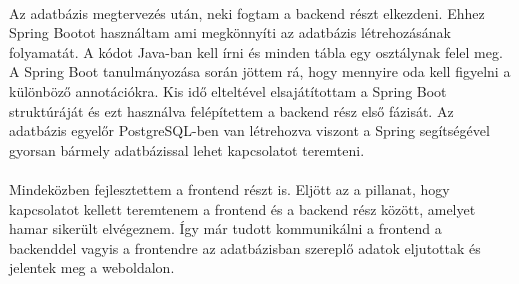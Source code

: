 	\paragraph{}
	Az adatbázis megtervezés után, neki fogtam a backend részt elkezdeni. Ehhez Spring Bootot használtam ami megkönnyíti az adatbázis létrehozásának folyamatát. A kódot Java-ban kell írni és minden tábla egy osztálynak felel meg. A Spring Boot tanulmányozása során jöttem rá, hogy mennyire oda kell figyelni a különböző annotációkra. Kis idő elteltével elsajátítottam a Spring Boot struktúráját és ezt használva felépítettem a backend rész első fázisát. Az adatbázis egyelőr PostgreSQL-ben van létrehozva viszont a Spring segítségével gyorsan bármely adatbázissal lehet kapcsolatot teremteni.
	\paragraph{}
	Mindeközben fejlesztettem a frontend részt is. Eljött az a pillanat, hogy kapcsolatot kellett teremtenem a frontend és a backend rész között, amelyet hamar sikerült elvégeznem. Így már tudott kommunikálni a frontend a backenddel vagyis a frontendre az adatbázisban szereplő adatok eljutottak és jelentek meg a weboldalon. 
